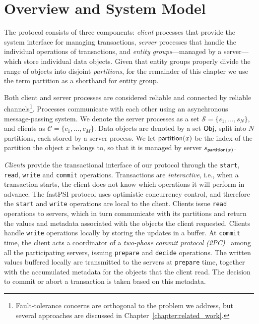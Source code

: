 \section{Overview and System Model}

The protocol consists of three components: \emph{client} processes that provide the system interface for managing transactions, \emph{server} processes that handle the individual operations of transactions, and \emph{entity groups}---managed by a server---which store individual data objects. Given that entity groups properly divide the range of objects into disjoint \emph{partitions}, for the remainder of this chapter we use the term partition as a shorthand for entity group.

Both client and server processes are considered reliable and connected by reliable channels\footnote{Fault-tolerance concerns are orthogonal to the problem we address, but several approaches are discussed in Chapter~\ref{chapter:related_work}.}. Processes communicate with each other using an asynchronous message-passing system. We denote the server processes as a set $\mathcal{S} = \{s_1, \dots, s_N\}$, and clients as $\mathcal{C} = \{c_1, \dots, c_M\}$. Data objects are denoted by a set ${\sf Obj}$, split into $N$ partitions, each stored by a server process. We let $\mathsf{partition}(x)$ be the index of the partition the object $x$ belongs to, so that it is managed by server $s_{\mathsf{partition}(x)}$.

\emph{Clients} provide the transactional interface of our protocol through the \texttt{start}, \texttt{read}, \texttt{write} and \texttt{commit} operations. Transactions are \emph{interactive}, i.e., when a transaction starts, the client does not know which operations it will perform in advance. The fastPSI protocol uses optimistic concurrency control, and therefore the \texttt{start} and \texttt{write} operations are local to the client. Clients issue \texttt{read} operations to servers, which in turn communicate with its partitions and return the values and metadata associated with the objects the client requested. Clients handle \texttt{write} operations locally by storing the updates in a buffer. At \texttt{commit} time, the client acts a coordinator of a \emph{two-phase commit protocol (2PC)}~\citep{bernstein_concurrency} among all the participating servers, issuing \texttt{prepare} and \texttt{decide} operations. The written values buffered locally are transmitted to the servers at \texttt{prepare} time, together with the accumulated metadata for the objects that the client read. The decision to commit or abort a transaction is taken based on this metadata.

